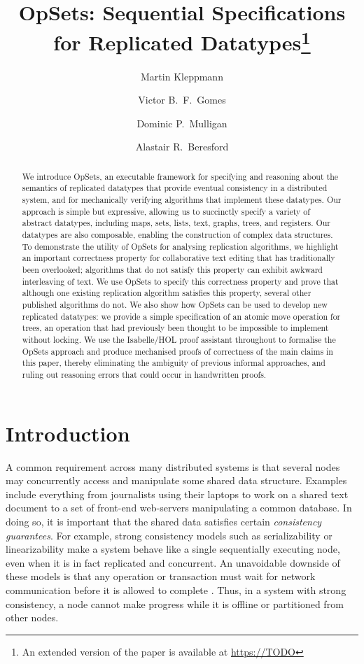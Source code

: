 \documentclass[a4paper,english]{lipics-v2018}
\title{OpSets: Sequential Specifications for Replicated Datatypes\footnote{An extended version of the paper is available at \url{https://TODO}}}
\author{Martin Kleppmann}{Computer Laboratory, University of Cambridge, UK}{mk428@cl.cam.ac.uk}{}{}
\author{Victor B.\ F.\ Gomes}{Computer Laboratory, University of Cambridge, UK}{vb358@cl.cam.ac.uk}{}{}
\author{Dominic P.\ Mulligan}{Security Research Group, Arm Research, Cambridge, UK}{Dominic.Mulligan@arm.com}{}{}
\author{Alastair R.\ Beresford}{Computer Laboratory, University of Cambridge, UK}{arb33@cl.cam.ac.uk}{}{}
\begin{document}
\maketitle

\begin{abstract}
We introduce OpSets, an executable framework for specifying and reasoning about the semantics of replicated datatypes that provide eventual consistency in a distributed system, and for mechanically verifying algorithms that implement these datatypes.
Our approach is simple but expressive, allowing us to succinctly specify a variety of abstract datatypes, including maps, sets, lists, text, graphs, trees, and registers.
Our datatypes are also composable, enabling the construction of complex data structures.
To demonstrate the utility of OpSets for analysing replication algorithms, we highlight an important correctness property for collaborative text editing that has traditionally been overlooked; algorithms that do not satisfy this property can exhibit awkward interleaving of text.
We use OpSets to specify this correctness property and prove that although one existing replication algorithm satisfies this property, several other published algorithms do not.
We also show how OpSets can be used to develop new replicated datatypes: we provide a simple specification of an atomic move operation for trees, an operation that had previously been thought to be impossible to implement without locking.
We use the Isabelle/HOL proof assistant throughout to formalise the OpSets approach and produce mechanised proofs of correctness of the main claims in this paper, thereby eliminating the ambiguity of previous informal approaches, and ruling out reasoning errors that could occur in handwritten proofs.
\end{abstract}
\clearpage

\section{Introduction}

A common requirement across many distributed systems is that several nodes may concurrently access and manipulate some shared data structure.
Examples include everything from journalists using their laptops to work on a shared text document to a set of front-end web-servers manipulating a common database.
In doing so, it is important that the shared data satisfies certain \emph{consistency guarantees}.
For example, strong consistency models such as serializability \cite{Kleppmann:2017wj} or linearizability \cite{Herlihy:1990jq} make a system behave like a single sequentially executing node, even when it is in fact replicated and concurrent.
An unavoidable downside of these models is that any operation or transaction must wait for network communication before it is allowed to complete \cite{Davidson:1985hv,Gilbert:2002il}.
Thus, in a system with strong consistency, a node cannot make progress while it is offline or partitioned from other nodes.
\end{document}
